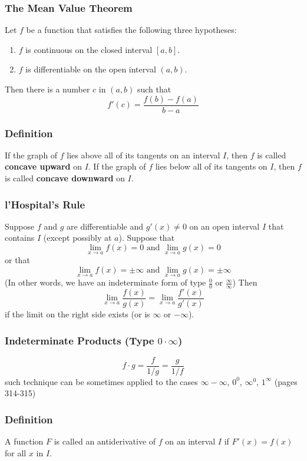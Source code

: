 \documentclass{article}
\begin{document}
\subsubsection*{The Mean Value Theorem}
Let \(f\) be a function that satisfies the following three hypotheses:
\begin{enumerate}
  \item \(f\) is continuous on the closed interval \([a,b]\).
  \item \(f\) is differentiable on the open interval \((a,b)\).
\end{enumerate}
Then there is a number \(c\) in \((a,b)\) such that 
\[
f'(c) = \frac{f(b)-f(a)}{b-a}
\]

\subsubsection*{Definition}
If the graph of \(f\) lies above all of its tangents on an interval \(I\), then \(f\) is called \textbf{concave upward} on \(I\). If the graph of \(f\) lies below all of its tangents on \(I\), then \(f\) is called \textbf{concave downward} on \(I\).

\subsubsection*{l’Hospital’s Rule}
Suppose \(f\) and \(g\) are differentiable and \(g'(x) \neq 0 \) on an open interval \(I\) that contains \(I\) (except possibly at \(a\)). Suppose that
\[
\lim_{x \to a} f(x) = 0 \text{ and } \lim_{x \to a} g(x) = 0
\]
or that 
\[
\lim_{x \to a} f(x) = \pm \infty \text{ and } \lim_{x \to a} g(x) = \pm \infty
\]
(In other words, we have an indeterminate form of type \( \frac{0}{0} \) or \( \frac{\infty}{\infty} \)) Then
\[
\lim_{x \to a} \frac{f(x)}{g(x)} = \lim_{x \to a} \frac{f'(x)}{g'(x)}
\]
if the limit on the right side exists (or is \(\infty\) or \(-\infty\)).

\subsubsection*{Indeterminate Products (Type \(0 \cdot \infty\))}
\[
f \cdot g = \frac{f}{1/g} = \frac{g}{1/f}
\]
such technique can be sometimes applied to the cases \( \infty - \infty\), \( 0^0\), \( \infty ^ 0\), \(1 ^ \infty \) (pages 314-315)

\subsubsection*{Definition}
A function \(F\) is called an antiderivative of \(f\) on an interval \(I\) if \(F'(x)=f(x)\) for all \(x\) in \(I\).
\end{document}
